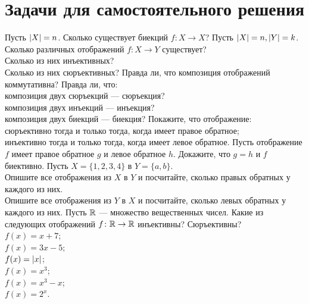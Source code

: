 \documentclass[a4paper,12pt]{article}
\begin{document}
    \section{Задачи для самостоятельного решения}
    
    \problem Пусть $\lvert X\rvert = n$. Сколько существует биекций $f \colon X \to X$?
    \problem Пусть $\lvert X\rvert = n, \lvert Y\rvert = k$. \\ 
    \sub Сколько различных отображений $f \colon X \to Y$ существует? \\
    \sub Сколько из них инъективных? \\
     Сколько из них сюръективных?
    \problem Правда ли, что композиция отображений коммутативна?
    \problem Правда ли, что: \\
    \sub композиция двух сюръекций --- сюръекция? \\
    \sub композиция двух инъекций --- инъекция? \\
    \sub композиция двух биекций --- биекция?
    \problem Покажите, что отображение: \\
     сюръективно тогда и только тогда, когда имеет правое обратное; \\
     инъективно тогда и только тогда, когда имеет левое обратное.
    \problem Пусть отображение $f$ имеет правое обратное $g$ и левое обратное $h$. Докажите, что \sub $g = h$ и \sub $f$ биективно.
    \problem Пусть $X = \{1, 2, 3, 4\}$ в $Y = \{a, b\}$. \\
    \sub Опишите все отображения из $X$ в $Y$ и посчитайте, сколько правых обратных у каждого из них. \\
    \sub Опишите все отображения из $Y$ в $X$ и посчитайте, сколько левых обратных у каждого из них.
    \problem Пусть $\mathbb{R}$ --- множество вещественных чисел. Какие из следующих отображений $f \colon \mathbb{R} \to \mathbb{R}$ инъективны? Сюръективны? \\
    \sub $f(x) = x + 7$; \\
    \sub $f(x) = 3x - 5$; \\
    \sub $f(x) = \lvert x\rvert$; \\
    \sub $f(x) = x^3$; \\
     $f(x) = x^3 - x$; \\
     $f(x) = 2^x$.
\end{document}
